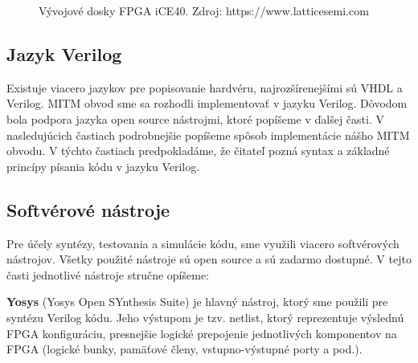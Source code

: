 \begin{figure}
    \centering
    \hfill
    \caption[Vývojové dosky FPGA iCE40]{Vývojové dosky FPGA iCE40. Zdroj: https://www.latticesemi.com}
    \label{obr:iceHw}
\end{figure}

\subsection{Jazyk Verilog}
Existuje viacero jazykov pre popisovanie hardvéru, najrozšírenejšími sú VHDL a Verilog. MITM obvod sme sa rozhodli implementovať v jazyku Verilog. Dôvodom bola podpora jazyka open source nástrojmi, ktoré popíšeme v ďalšej časti. V nasledujúcich častiach podrobnejšie popíšeme spôsob implementácie nášho MITM obvodu. V týchto častiach predpokladáme, že čitateľ pozná syntax a základné princípy písania kódu v jazyku Verilog.

\subsection{Softvérové nástroje}\label{sek:software}
Pre účely syntézy, testovania a simulácie kódu, sme využili viacero softvérových nástrojov. Všetky použité nástroje sú open source a sú zadarmo dostupné. V tejto časti jednotlivé nástroje stručne opíšeme:

\textbf{Yosys} (Yosys Open SYnthesis Suite) \cite{yosys} je hlavný nástroj, ktorý sme použili pre syntézu Verilog kódu. Jeho výstupom je tzv. netlist, ktorý reprezentuje výslednú FPGA konfiguráciu, presnejšie logické prepojenie jednotlivých komponentov na FPGA (logické bunky, pamäťové členy, vstupno-výstupné porty a pod.).

